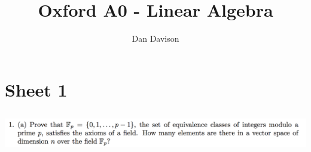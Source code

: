 \documentclass[12pt]{article}
\begin{document}
\title{Oxford A0 - Linear Algebra }
\author{Dan Davison}
\maketitle

\section*{Sheet 1}
\subsection*{} %
\includegraphics[width=450pt]{img/linear-algebra-a0-1-1-a.png}\\
\end{document}

